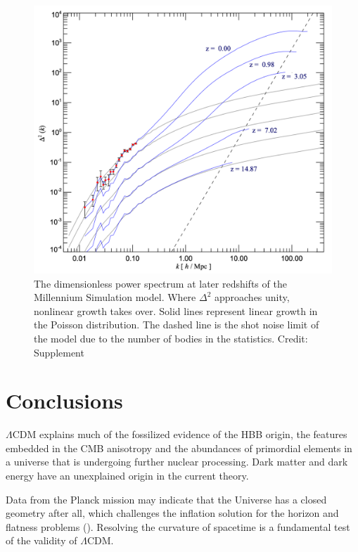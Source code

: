 \documentclass{paper}
\begin{document}
  \begin{figure}[H]
    \begin{centering}
    \includegraphics[scale=0.4]{Struct-power_spectrum.pdf}
    \caption{The dimensionless power spectrum at later redshifts of the
      Millennium Simulation model. Where \(\Delta^2\) approaches unity, 
      nonlinear growth takes over. Solid lines represent linear growth in the 
      Poisson distribution. The dashed line is the shot noise limit of the 
      model due to the number of bodies in the statistics.
    Credit: \cite{2005Natur.435..629S} Supplement}
    \label{fig:Struct-power_spectrum}
    \end{centering}
  \end{figure}

\section*{Conclusions}
  $\Lambda$CDM explains much of the fossilized evidence
  of the HBB origin, the features embedded in the CMB anisotropy 
  and the abundances of primordial elements in a universe that is 
  undergoing further nuclear processing. Dark matter and dark energy have an 
  unexplained origin in the current theory.

  Data from the Planck mission may indicate that the Universe has a closed 
  geometry after all, which challenges the inflation solution for the horizon
  and flatness problems (\cite{2020NatAs...4..196D}). Resolving the 
  curvature of spacetime is a fundamental test of the validity of 
  $\Lambda$CDM. 
\end{document}
